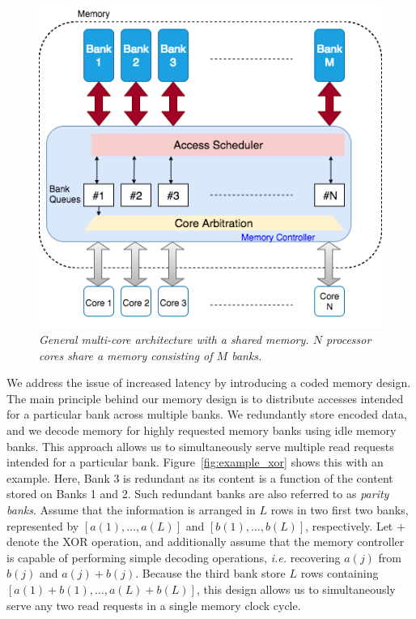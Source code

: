 \begin{figure}[t!]
\centering
\includegraphics[width=\linewidth]{fig/fig-2-memory-controller.png}
\caption{\it{General multi-core architecture with a shared memory. $N$ processor cores share a memory consisting of $M$ banks.}}
\label{fig:multicore_arch}
\end{figure}
We address the issue of increased latency by introducing a coded memory design. The main principle behind our memory design is to distribute accesses intended for a particular bank across multiple banks. We redundantly store encoded data, and we decode memory for highly requested memory banks using idle memory banks. This approach allows us to simultaneously serve multiple read requests intended for a particular bank. Figure~\ref{fig:example_xor} shows this with an example. Here, Bank 3 is redundant as its content is a function of the content stored on Banks 1 and 2. Such redundant banks are also referred to as {\em parity banks}. Assume that the information is arranged in $L$ rows in two first two banks, represented by $[a(1),\ldots, a(L)]$ and $[b(1),\ldots, b(L)]$, respectively. Let $+$ denote the XOR operation, and additionally assume that the memory controller is capable of performing simple decoding operations, \textit{i.e.} recovering $a(j)$ from $b(j)$ and $a(j) + b(j)$. Because the third bank store $L$ rows containing $[a(1) + b(1),\ldots, a(L) + b(L)]$, this design allows us to simultaneously serve any two read requests in a single memory clock cycle.   

